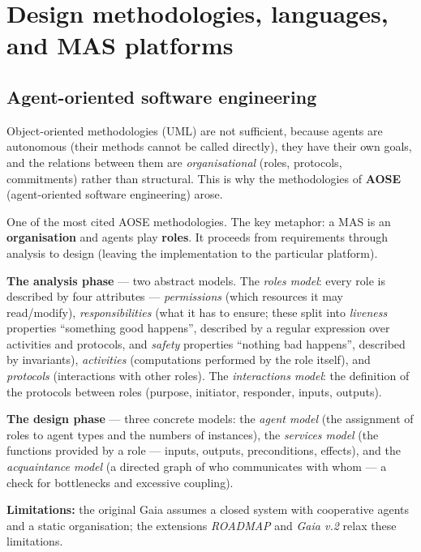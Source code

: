 \documentclass[11pt,a4paper]{article}
\theoremstyle{definition}
\providecommand{\uv}[1]{``#1''}
\begin{document}
\section{Design methodologies, languages, and MAS platforms}
\label{sec:metodologie}

\subsection{Agent-oriented software engineering}
Object-oriented methodologies (UML) are not sufficient, because agents are autonomous (their methods
cannot be called directly), they have their own goals, and the relations between them are
\emph{organisational} (roles, protocols, commitments) rather than structural. This is why the
methodologies of \textbf{AOSE} (agent-oriented software engineering) arose.

\begin{defbox}
One of the most cited AOSE methodologies. The key metaphor: a MAS is an \textbf{organisation} and
agents play \textbf{roles}. It proceeds from requirements through analysis to design (leaving the
implementation to the particular platform).

\textbf{The analysis phase} --- two abstract models. The \emph{roles model}: every
role is described by four attributes --- \emph{permissions} (which resources it may read/modify),
\emph{responsibilities} (what it has to ensure; these split into \emph{liveness} properties
\uv{something good happens}, described by a regular expression over activities and protocols, and
\emph{safety} properties \uv{nothing bad happens}, described by invariants), \emph{activities}
(computations performed by the role itself), and \emph{protocols} (interactions with other roles). The
\emph{interactions model}: the definition of the protocols between roles (purpose, initiator,
responder, inputs, outputs).

\textbf{The design phase} --- three concrete models: the \emph{agent model} (the assignment of roles to
agent types and the numbers of instances), the \emph{services model} (the functions provided by a role
--- inputs, outputs, preconditions, effects), and the \emph{acquaintance model} (a directed graph of who
communicates with whom --- a check for bottlenecks and excessive coupling).

\textbf{Limitations:} the original Gaia assumes a closed system with cooperative agents and a static
organisation; the extensions \emph{ROADMAP} and \emph{Gaia v.2} relax these limitations.
\end{defbox}
\end{document}
